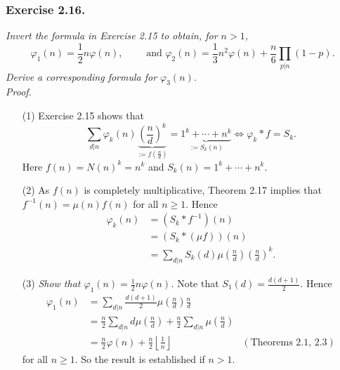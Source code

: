 \documentclass{article}
\begin{document}
\subsubsection*{Exercise 2.16.}
\emph{Invert the formula in Exercise 2.15 to obtain, for $n > 1$,
\[
  \varphi_1(n) = \frac{1}{2}n\varphi(n),
  \qquad\text{ and }
  \varphi_2(n) = \frac{1}{3}n^2 \varphi(n) + \frac{n}{6} \prod_{p|n}(1-p).
\]
Derive a corresponding formula for $\varphi_3(n)$.} \\



\emph{Proof.}
\begin{enumerate}
\item[(1)]
  Exercise 2.15 shows that
  \[
    \sum_{d|n} \varphi_k(n) \underbrace{\left(\frac{n}{d}\right)^k}_{:= f\left(\frac{n}{d}\right)}
        = \underbrace{1^k + \cdots + n^k}_{:= S_k(n)}
    \Longleftrightarrow
    \varphi_k * f = S_k.
  \]
  Here $f(n) = N(n)^k = n^k$ and $S_k(n) = 1^k + \cdots + n^k$.

\item[(2)]
  As $f(n)$ is completely multiplicative,
  Theorem 2.17 implies that $f^{-1}(n) = \mu(n) f(n)$ for all $n \geq 1$.
  Hence
  \begin{align*}
    \varphi_k(n)
    &= (S_k * f^{-1})(n) \\
    &= (S_k * (\mu f))(n) \\
    &= \sum_{d|n} S_k(d) \mu\left(\frac{n}{d}\right)\left(\frac{n}{d}\right)^k.
  \end{align*}

\item[(3)]
  \emph{Show that $\varphi_1(n) = \frac{1}{2}n\varphi(n)$.}
  Note that $S_1(d) = \frac{d(d+1)}{2}$.
  Hence
  \begin{align*}
    \varphi_1(n)
    &= \sum_{d|n} \frac{d(d+1)}{2} \mu\left(\frac{n}{d}\right) \frac{n}{d} \\
    &= \frac{n}{2} \sum_{d|n} d \mu\left(\frac{n}{d}\right)
        + \frac{n}{2} \sum_{d|n} \mu\left(\frac{n}{d}\right) \\
    &= \frac{n}{2} \varphi(n)
        + \frac{n}{2} \left\lfloor \frac{1}{n} \right\rfloor
      &(\text{Theorems 2.1, 2.3})
  \end{align*}
  for all $n \geq 1$.
  So the result is established if $n > 1$.


\end{enumerate}
\end{document}
